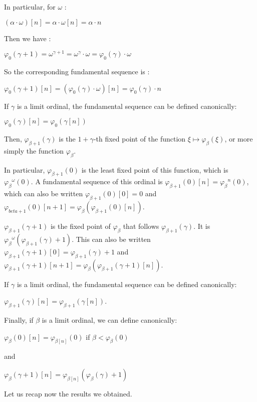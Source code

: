 \documentclass[10pt]{article}
\begin{document}
In particular, for \( \omega \) :

\( (\alpha \cdot \omega)[n] = \alpha \cdot \omega[n] = \alpha \cdot n \)

Then we have :

\( \varphi_0(\gamma+1) = \omega^{\gamma+1} = \omega^\gamma \cdot \omega = \varphi_0(\gamma) \cdot \omega \)

So the corresponding fundamental sequence is : 

\( \varphi_0(\gamma+1)[n] = (\varphi_0(\gamma) \cdot \omega)[n] = \varphi_0(\gamma) \cdot n \)

If \( \gamma \) is a limit ordinal, the fundamental sequence can be defined canonically:

\( \varphi_0(\gamma)[n] = \varphi_0(\gamma[n]) \)

Then, \( \varphi_{\beta+1}(\gamma) \) is the \(1+\gamma\)-th fixed point of the function \( \xi \mapsto \varphi_\beta(\xi) \), or more simply the function \( \varphi_\beta \).

In particular, \( \varphi_{\beta+1}(0) \) is the least fixed point of this function, which is \( {\varphi_\beta}^\omega(0) \). A fundamental sequence of this ordinal is \( \varphi_{\beta+1}(0)[n] = {\varphi_\beta}^n(0) \), which can also be written \( \varphi_{\beta+1}(0)[0] = 0 \) and \( \varphi_{beta+1}(0)[n+1] = \varphi_\beta(\varphi_{\beta+1}(0)[n]) \).

\( \varphi_{\beta+1}(\gamma+1) \) is the fixed point of \( \varphi_\beta \) that follows \( \varphi_{\beta+1}(\gamma) \). It is \( {\varphi_\beta}^\omega(\varphi_{\beta+1}(\gamma)+1) \). This can also be written \( \varphi_{\beta+1}(\gamma+1)[0] = \varphi_{\beta+1}(\gamma)+1 \) and \( \varphi_{\beta+1}(\gamma+1)[n+1] = \varphi_\beta(\varphi_{\beta+1}(\gamma+1)[n]) \).

If \( \gamma \) is a limit ordinal, the fundamental sequence can be defined canonically:

\( \varphi_{\beta+1}(\gamma)[n] = \varphi_{\beta+1}(\gamma[n]) \).

Finally, if \( \beta \) is a limit ordinal, we can define canonically:

\( \varphi_\beta(0)[n] =  \varphi_{\beta[n]}(0) \) if \( \beta < \varphi_\beta(0) \)

and

\( \varphi_\beta(\gamma+1)[n] = \varphi_{\beta[n]}(\varphi_\beta(\gamma)+1) \)

\bigskip

Let us recap now the results we obtained.
\end{document}
